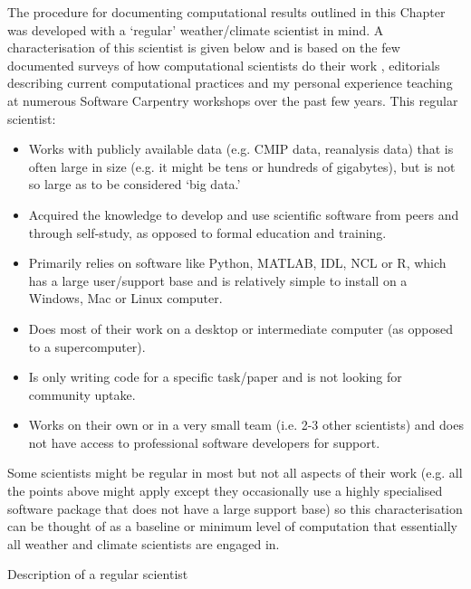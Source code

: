 \begin{featurebox}

\begin{tcolorbox}[width=\textwidth]

The procedure for documenting computational results outlined in this Chapter was developed with a `regular' weather/climate scientist in mind. A characterisation of this scientist is given below and is based on the few documented surveys of how computational scientists do their work \citep{Hannay2009,Stodden2010,Momcheva2015}, editorials describing current computational practices \citep[e.g.][]{Easterbrook2014} and my personal experience teaching at numerous Software Carpentry workshops \citep{Wilson2014} over the past few years. This regular scientist:
\begin{itemize}
\item Works with publicly available data (e.g. CMIP data, reanalysis data) that is often large in size (e.g. it might be tens or hundreds of gigabytes), but is not so large as to be considered `big data.' 
\item Acquired the knowledge to develop and use scientific software from peers and through self-study, as opposed to formal education and training.
\item Primarily relies on software like Python, MATLAB, IDL, NCL or R, which has a large user/support base and is relatively simple to install on a Windows, Mac or Linux computer.
\item Does most of their work on a desktop or intermediate computer (as opposed to a supercomputer).
\item Is only writing code for a specific task/paper and is not looking for community uptake.  
\item Works on their own or in a very small team (i.e. 2-3 other scientists) and does not have access to professional software developers for support.
\end{itemize}

Some scientists might be regular in most but not all aspects of their work (e.g. all the points above might apply except they occasionally use a highly specialised software package that does not have a large support base) so this characterisation can be thought of as a baseline or minimum level of computation that essentially all weather and climate scientists are engaged in.  

\end{tcolorbox}

\caption{\label{box:regular_scientist}
Description of a regular scientist}
\end{featurebox}


